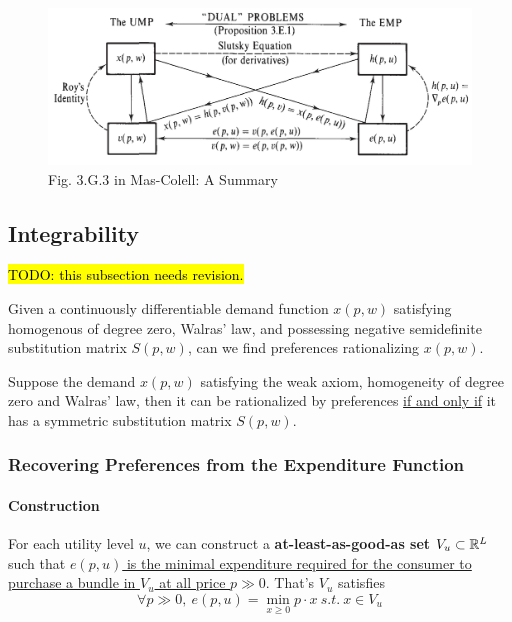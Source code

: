 \documentclass{article}
\begin{document}
 			\begin{figure}[h]
 				\centering
 				\includegraphics[width=1.0\linewidth]{figures/duality}
 				\caption{Fig. 3.G.3 in Mas-Colell: A Summary}
 			\end{figure}
 		
 		\subsection{Integrability}
 			\par \hl{TODO: this subsection needs revision.}
 			\begin{remark}
 				Given a continuously differentiable demand function $x(p, w)$ satisfying homogenous of degree zero, Walras' law, and possessing negative semidefinite substitution matrix $S(p, w)$, can we find preferences rationalizing $x(p,w)$.
 			\end{remark}
 			
 			\begin{proposition}
 				Suppose the demand $x(p, w)$ satisfying the weak axiom, homogeneity of degree zero and Walras' law, then it can be rationalized by preferences \ul{if and only if} it has a symmetric substitution matrix $S(p, w)$.
 			\end{proposition}
 			
 			\subsubsection{Recovering Preferences from the Expenditure Function}
 			
 			\paragraph{Construction}For each utility level $u$, we can construct a \textbf{at-least-as-good-as set} $V_u \subset \mathbb{R}^L$ such that \ul{$e(p, u)$ is the minimal expenditure required for the consumer to purchase a bundle in $V_u$ at all price $p \gg 0$}. That's $V_u$ satisfies
 			\begin{equation}
 				\forall p \gg 0,\ e(p, u) = \min_{x \geq 0} p \cdot x\ s.t.\ x \in V_u
 			\end{equation}
 			
\end{document}
